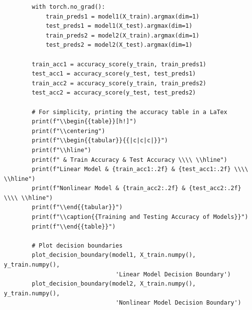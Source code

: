 \documentclass[11pt, oneside]{article}   	%
\begin{document}
\begin{verbatim}
        with torch.no_grad():
            train_preds1 = model1(X_train).argmax(dim=1)
            test_preds1 = model1(X_test).argmax(dim=1)
            train_preds2 = model2(X_train).argmax(dim=1)
            test_preds2 = model2(X_test).argmax(dim=1)
        
        train_acc1 = accuracy_score(y_train, train_preds1)
        test_acc1 = accuracy_score(y_test, test_preds1)
        train_acc2 = accuracy_score(y_train, train_preds2)
        test_acc2 = accuracy_score(y_test, test_preds2)
        
        # For simplicity, printing the accuracy table in a LaTex
        print(f"\\begin{{table}}[h!]")
        print(f"\\centering")
        print(f"\\begin{{tabular}}{{|c|c|c|}}")
        print(f"\\hline")
        print(f" & Train Accuracy & Test Accuracy \\\\ \\hline")
        print(f"Linear Model & {train_acc1:.2f} & {test_acc1:.2f} \\\\ \\hline")
        print(f"Nonlinear Model & {train_acc2:.2f} & {test_acc2:.2f} \\\\ \\hline")
        print(f"\\end{{tabular}}")
        print(f"\\caption{{Training and Testing Accuracy of Models}}")
        print(f"\\end{{table}}")
        
        # Plot decision boundaries
        plot_decision_boundary(model1, X_train.numpy(), y_train.numpy(), 
                                'Linear Model Decision Boundary')
        plot_decision_boundary(model2, X_train.numpy(), y_train.numpy(), 
                                'Nonlinear Model Decision Boundary')
    
\end{verbatim}
\end{document}
